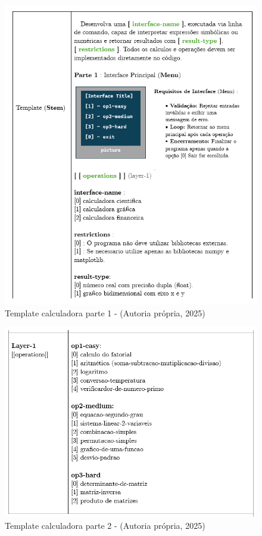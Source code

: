 \begin{figure}
    \centering
    \includegraphics[width=12cm]{./imagens/capitulo4/template-1.png}
    \caption{Template calculadora parte 1 - (Autoria própria, 2025)}
    \label{fig:template-1}
\end{figure}

\begin{figure}
    \centering
    \includegraphics[width=12cm]{./imagens/capitulo4/template-2.png}
    \caption{Template calculadora parte 2 - (Autoria própria, 2025)}
    \label{fig:template-2}
\end{figure}



